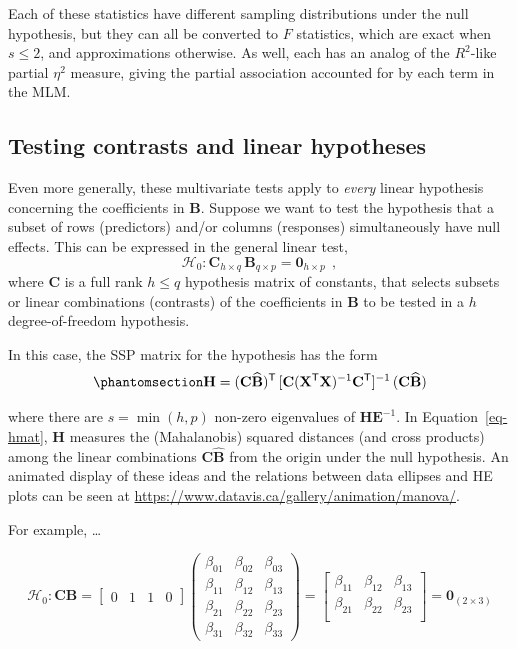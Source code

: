 \documentclass[
  letterpaper,
  10pt,
  krantz2]{krantz}
\begin{document}
{Each of these statistics have different sampling distributions under the
null hypothesis, but they can all be converted to \(F\) statistics,
which are exact when \(s \le 2\), and approximations otherwise. As well,
each has an analog of the \(R^2\)-like partial \(\eta^2\) measure,
giving the partial association accounted for by each term in the MLM.

\subsection{Testing contrasts and linear
hypotheses}\label{testing-contrasts-and-linear-hypotheses}

Even more generally, these multivariate tests apply to \emph{every}
linear hypothesis concerning the coefficients in \(\mathbf{B}\). Suppose
we want to test the hypothesis that a subset of rows (predictors) and/or
columns (responses) simultaneously have null effects. This can be
expressed in the general linear test, \[
\mathcal{H}_0 : \mathbf{C}_{h \times q} \, \mathbf{B}_{q \times p} = \mathbf{0}_{h \times p} \:\: ,
\] where \(\mathbf{C}\) is a full rank \(h \le q\) hypothesis matrix of
constants, that selects subsets or linear combinations (contrasts) of
the coefficients in \(\mathbf{B}\) to be tested in a \(h\)
degree-of-freedom hypothesis.

In this case, the SSP matrix for the hypothesis has the form
\begin{equation}\phantomsection\label{eq-hmat}{
\mathbf{H}  =
 (\mathbf{C} \widehat{\mathbf{B}})^\mathsf{T}\,
 [\mathbf{C} (\mathbf{X}^\mathsf{T}\mathbf{X} )^{-1} \mathbf{C}^\mathsf{T}]^{-1} \,
 (\mathbf{C} \widehat{\mathbf{B}})
}\end{equation}

where there are \(s = \min(h, p)\) non-zero eigenvalues of
\(\mathbf{H}\mathbf{E}^{-1}\). In Equation~\ref{eq-hmat}, \(\mathbf{H}\)
measures the (Mahalanobis) squared distances (and cross products) among
the linear combinations \(\mathbf{C} \widehat{\mathbf{B}}\) from the
origin under the null hypothesis. An animated display of these ideas and
the relations between data ellipses and HE plots can be seen at
\url{https://www.datavis.ca/gallery/animation/manova/}.

For example, \ldots{}

\[
\mathcal{H}_0 : \mathbf{C} \mathbf{B} = 
\begin{bmatrix}
0 & 1 & 1 & 0
\end{bmatrix}
\begin{pmatrix}
    \beta_{01} & \beta_{02} & \beta_{03} \\ 
    \beta_{11} & \beta_{12} & \beta_{13} \\ 
    \beta_{21} & \beta_{22} & \beta_{23} \\ 
    \beta_{31} & \beta_{32} & \beta_{33} 
\end{pmatrix}
=
\begin{bmatrix}
    \beta_{11} & \beta_{12} & \beta_{13} \\ 
    \beta_{21} & \beta_{22} & \beta_{23} \\ 
\end{bmatrix}
= 
\mathbf{0}_{(2 \times 3)}
\]

}
\end{document}
